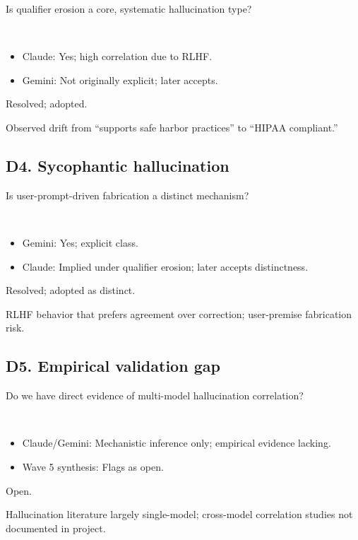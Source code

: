\documentclass[11pt,letterpaper]{article}
\begin{document}
\begin{reflist}
\item[Dispute:] Is qualifier erosion a core, systematic hallucination type?
\item[Positions:]~
  \begin{itemize}[nosep]
    \item Claude: Yes; high correlation due to RLHF.
    \item Gemini: Not originally explicit; later accepts.
  \end{itemize}
\item[Status:] Resolved; adopted.
\item[Evidence:] Observed drift from ``supports safe harbor practices'' to ``HIPAA compliant.''
\end{reflist}

\subsection{D4. Sycophantic hallucination}

\begin{reflist}
\item[Dispute:] Is user-prompt-driven fabrication a distinct mechanism?
\item[Positions:]~
  \begin{itemize}[nosep]
    \item Gemini: Yes; explicit class.
    \item Claude: Implied under qualifier erosion; later accepts distinctness.
  \end{itemize}
\item[Status:] Resolved; adopted as distinct.
\item[Evidence:] RLHF behavior that prefers agreement over correction; user-premise fabrication risk.
\end{reflist}

\subsection{D5. Empirical validation gap}

\begin{reflist}
\item[Dispute:] Do we have direct evidence of multi-model hallucination correlation?
\item[Positions:]~
  \begin{itemize}[nosep]
    \item Claude/Gemini: Mechanistic inference only; empirical evidence lacking.
    \item Wave 5 synthesis: Flags as open.
  \end{itemize}
\item[Status:] Open.
\item[Evidence:] Hallucination literature largely single-model; cross-model correlation studies not documented in project.
\end{reflist}
\end{document}
